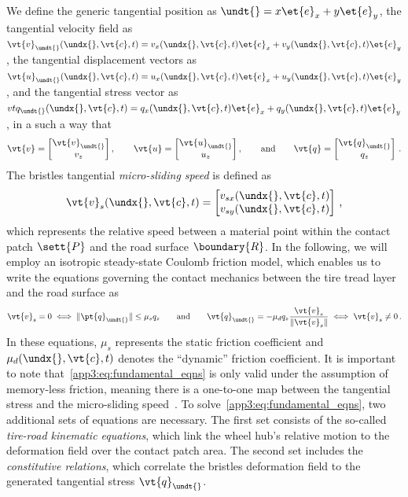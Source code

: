 We define the generic tangential position as $\undt{}
 = x\et{e}_x + y\et{e}_y$, the tangential velocity field as $\vt{v}_{\undt{}
}(\undx{}, \vt{c}, t) = v_x(\undx{}, \vt{c}, t)\et{e}_x + v_y(\undx{},\vt{c},t)\et{e}_y$, the tangential displacement vectors as $\vt{u}_{\undt{}
}(\undx{},\vt{c},t) = u_x(\undx{},\vt{c},t)\et{e}_x + u_y(\undx{},\vt{c},t)\et{e}_y$, and the tangential stress vector as $vt{q}_{\undt{}
}(\undx{},\vt{c},t) = q_x(\undx{},\vt{c},t)\et{e}_x + q_y(\undx{},\vt{c},t)\et{e}_y$, in a such a way that
%
\begin{equation}
  \vt{v} =
  \begin{bmatrix}
    \vt{v}_{\undt{}
} \\
    v_z
  \end{bmatrix}, \qquad
  \vt{u} =
  \begin{bmatrix}
    \vt{u}_{\undt{}
} \\
    u_z
  \end{bmatrix}, \qquad \text{and} \qquad
  \vt{q} =
  \begin{bmatrix}
    \vt{q}_{\undt{}
} \\
    q_z
  \end{bmatrix} \, \text{.}
  \label{app3:eq:ut}
\end{equation}
%
The bristles tangential \emph{micro-sliding speed} is defined as
%
\begin{equation}
  \vt{v}_s(\undx{},\vt{c},t) =
  \begin{bmatrix}
    v_{sx}(\undx{},\vt{c},t) \\
    v_{sy}(\undx{},\vt{c},t)
  \end{bmatrix} \, \text{,}
\end{equation}
%
which represents the relative speed between a material point within the contact patch $\sett{P}$ and the road surface $\boundary{R}$. In the following, we will employ an isotropic steady-state Coulomb friction model, which enables us to write the equations governing the contact mechanics between the tire tread layer and the road surface as
%
\begin{equation}
  \vt{v}_s = 0 \iff \|\pt{q}_{\undt{}
}\| \leq \mu_s q_z
  \qquad \text{and} \qquad
  \vt{q}_{\undt{}
} = -\mu_d q_z \dfrac{\vt{v}_s}{\|\vt{v}_s\|}
  \iff \vt{v}_s \neq 0 \, \text{.}
  \label{app3:eq:fundamental_eqns}
\end{equation}
%
In these equations, $\mu_s$ represents the static friction coefficient and $\mu_d(\undx{}, \vt{c}, t)$ denotes the ``dynamic'' friction coefficient. It is important to note that~\eqref{app3:eq:fundamental_eqns} is only valid under the assumption of memory-less friction, meaning there is a one-to-one map between the tangential stress and the micro-sliding speed~\cite{canudasdewit2003dynamic}. To solve~\eqref{app3:eq:fundamental_eqns}, two additional sets of equations are necessary. The first set consists of the so-called \emph{tire-road kinematic equations}, which link the wheel hub's relative motion to the deformation field over the contact patch area. The second set includes the \emph{constitutive relations}, which correlate the bristles deformation field to the generated tangential stress $\vt{q}_{\undt{}
}$.

